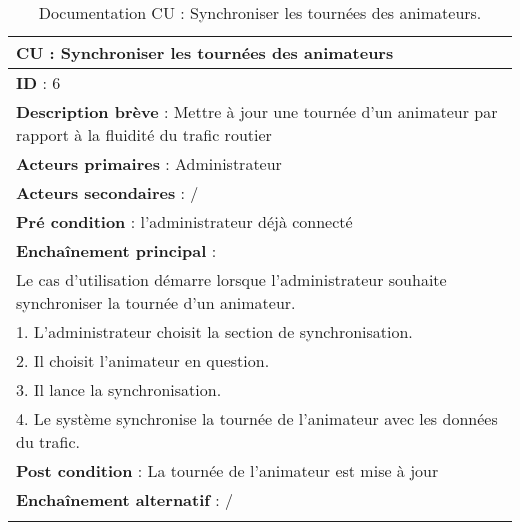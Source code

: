 \renewcommand{\arraystretch}{1.5}
\begin{xltabular}{\linewidth}{|X|}
    \hline
    \textbf{CU} : Synchroniser les tournées des animateurs      \\\hline
    \textbf{ID} :  6    \\\hline
    \textbf{Description brève} : Mettre à jour une tournée d'un animateur par rapport à la fluidité du trafic routier     \\\hline
    \textbf{Acteurs primaires} :  Administrateur    \\\hline
    \textbf{Acteurs secondaires} :  /    \\\hline
    \textbf{Pré condition} :  l'administrateur déjà connecté   \\\hline
    \textbf{Enchaînement principal} : \\
    Le cas d'utilisation démarre lorsque l'administrateur souhaite synchroniser la tournée d'un animateur. \\
    1. L'administrateur choisit la section de synchronisation. \\
    2. Il choisit l'animateur en question. \\
    3. Il lance la synchronisation. \\
    4. Le système synchronise la tournée de l'animateur avec les données du trafic.
    \\\hline
    \textbf{Post condition} : La tournée de l'animateur est mise à jour     \\\hline
    \textbf{Enchaînement alternatif} :   /   \\\hline

    \caption{Documentation CU : Synchroniser les tournées des animateurs.}
    \label{tab:cu-specs2}
\end{xltabular}
\FloatBarrier

